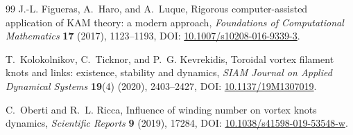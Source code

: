 \documentclass[11pt]{article}
\theoremstyle{definition}
\theoremstyle{plain}
\theoremstyle{remark}
\begin{document}
\begin{thebibliography}{99}
            J.-L. Figueras, A.~Haro, and A.~Luque,
            \newblock Rigorous computer-assisted application of KAM theory: a modern approach,
            \newblock \emph{Foundations of Computational Mathematics} \textbf{17} (2017), 1123--1193,
            \newblock DOI: \href{https://doi.org/10.1007/s10208-016-9339-3}{10.1007/s10208-016-9339-3}.

            T.~Kolokolnikov, C.~Ticknor, and P.~G. Kevrekidis,
            \newblock Toroidal vortex filament knots and links: existence, stability and dynamics,
            \newblock \emph{SIAM Journal on Applied Dynamical Systems} \textbf{19}(4) (2020), 2403--2427,
            \newblock DOI: \href{https://doi.org/10.1137/19M1307019}{10.1137/19M1307019}.

            C.~Oberti and R.~L. Ricca,
            \newblock Influence of winding number on vortex knots dynamics,
            \newblock \emph{Scientific Reports} \textbf{9} (2019), 17284,
            \newblock DOI: \href{https://doi.org/10.1038/s41598-019-53548-w}{10.1038/s41598-019-53548-w}.

        \end{thebibliography}
\end{document}
